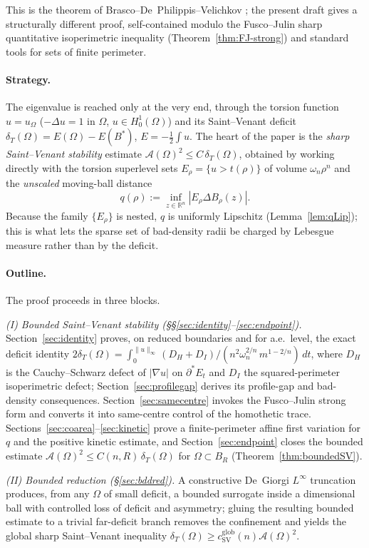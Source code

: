 \documentclass[11pt]{amsart}
\theoremstyle{definition}
\newcommand{\R}{\mathbb R}
\newcommand{\Om}{\Omega}
\newcommand{\Fr}{\mathcal A}
\newcommand{\dT}{\delta_T}
\newcommand{\Bstar}{B^*}
\begin{document}
This is the theorem of Brasco--De~Philippis--Velichkov \cite{BDV}; the present
draft gives a structurally different proof, self-contained modulo the Fusco--Julin
sharp quantitative isoperimetric inequality (Theorem~\ref{thm:FJ-strong}) and
standard tools for sets of finite perimeter.

\paragraph{Strategy.} The eigenvalue is reached only at the very end, through
the torsion function \(u=u_\Om\) (\(-\Delta u=1\) in \(\Om\), \(u\in
H^1_0(\Om)\)) and its Saint--Venant deficit
\(\dT(\Om)=E(\Om)-E(\Bstar)\), \(E=-\tfrac12\int u\).  The heart of the paper is
the \emph{sharp Saint--Venant stability} estimate
\(\Fr(\Om)^2\le C\,\dT(\Om)\), obtained by working directly with the torsion
superlevel sets \(E_\rho=\{u>t(\rho)\}\) of volume \(\omega_n\rho^n\) and the
\emph{unscaled} moving-ball distance
\[
   q(\rho):=\inf_{z\in\R^n}|E_\rho\Delta B_\rho(z)| .
\]
Because the family \(\{E_\rho\}\) is nested, \(q\) is uniformly Lipschitz
(Lemma~\ref{lem:qLip}); this is what lets the sparse set of bad-density radii be
charged by Lebesgue measure rather than by the deficit.

\paragraph{Outline.} The proof proceeds in three blocks.

\emph{(I) Bounded Saint--Venant stability
(\S\S\ref{sec:identity}--\ref{sec:endpoint}).}
Section~\ref{sec:identity} proves, on reduced boundaries and for a.e.\ level, the
exact deficit identity
\(2\dT(\Om)=\int_0^{\|u\|_\infty}(D_H+D_I)/(n^2\omega_n^{2/n}\,m^{1-2/n})\,dt\),
where \(D_H\) is the Cauchy--Schwarz defect of \(|\nabla u|\) on
\(\partial^*E_t\) and \(D_I\) the squared-perimeter isoperimetric defect;
Section~\ref{sec:profilegap} derives its profile-gap and bad-density
consequences.  Section~\ref{sec:samecentre} invokes the Fusco--Julin strong form and converts
it into same-centre control of the homothetic trace.
Sections~\ref{sec:coarea}--\ref{sec:kinetic} prove a finite-perimeter affine
first variation for \(q\) and the positive kinetic estimate, and
Section~\ref{sec:endpoint} closes the bounded estimate
\(\Fr(\Om)^2\le C(n,R)\,\dT(\Om)\) for \(\Om\subset B_R\)
(Theorem~\ref{thm:boundedSV}).

\emph{(II) Bounded reduction (\S\ref{sec:bddred}).}
A constructive De~Giorgi \(L^\infty\) truncation produces, from any \(\Om\) of
small deficit, a bounded surrogate inside a dimensional ball with controlled
loss of deficit and asymmetry; gluing the resulting bounded estimate to a
trivial far-deficit branch removes the confinement and yields the global sharp
Saint--Venant inequality \(\dT(\Om)\ge c_{\mathrm{SV}}^{\mathrm{glob}}(n)
\Fr(\Om)^2\).
\end{document}
